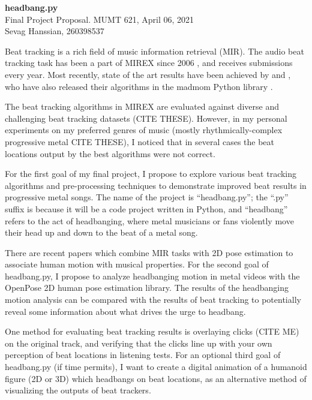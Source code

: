 \documentclass[letter,12pt]{report}
\begin{document}
\Large{\textbf{headbang.py}}\\
\large{Final Project Proposal. MUMT 621, April 06, 2021}\\
\large{Sevag Hanssian, 260398537}

\vspace{2em}

Beat tracking is a rich field of music information retrieval (MIR). The audio beat tracking task has been a part of MIREX since 2006 \cite{mirex06}, and receives submissions every year. Most recently, state of the art results have been achieved by \cite{bock1} and \cite{bock2}, who have also released their algorithms in the madmom Python library \cite{madmom}.

\vspace{1em}

\qquad The beat tracking algorithms in MIREX are evaluated against diverse and challenging beat tracking datasets (CITE THESE). However, in my personal experiments on my preferred genres of music (mostly rhythmically-complex progressive metal CITE THESE), I noticed that in several cases the beat locations output by the best algorithms were not correct.

\vspace{1em}

\qquad For the first goal of my final project, I propose to explore various beat tracking algorithms and pre-processing techniques to demonstrate improved beat results in progressive metal songs. The name of the project is ``headbang.py''; the ``.py'' suffix is because it will be a code project written in Python, and ``headbang'' refers to the act of headbanging, where metal musicians or fans violently move their head up and down to the beat of a metal song.

\vspace{1em}

\qquad There are recent papers which combine MIR tasks with 2D pose estimation to associate human motion with musical properties. For the second goal of headbang.py, I propose to analyze headbanging motion in metal videos with the OpenPose 2D human pose estimation library. The results of the headbanging motion analysis can be compared with the results of beat tracking to potentially reveal some information about what drives the urge to headbang.

\vspace{1em}

\qquad One method for evaluating beat tracking results is overlaying clicks (CITE ME) on the original track, and verifying that the clicks line up with your own perception of beat locations in listening tests. For an optional third goal of headbang.py (if time permits), I want to create a digital animation of a humanoid figure (2D or 3D) which headbangs on beat locations, as an alternative method of visualizing the outputs of beat trackers.

\vfill
\clearpage

\nocite{*}
\printbibheading[title={\vspace{-3.5em}References},heading=bibnumbered]
\vspace{-1.5em}
\printbibliography[heading=none]
\end{document}
